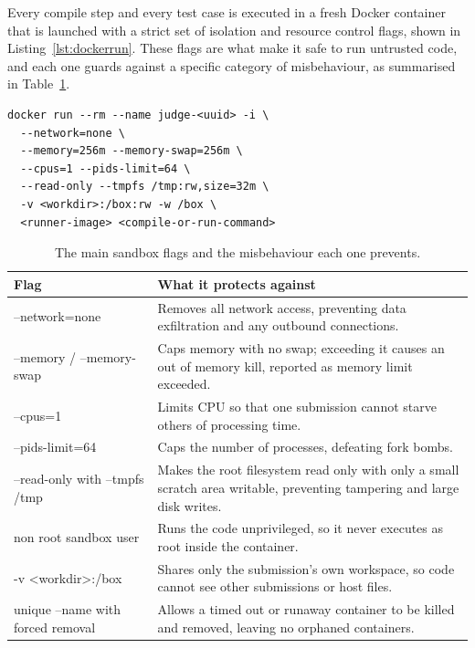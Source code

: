\documentclass[12pt,a4paper]{report}
\begin{document}
Every compile step and every test case is executed in a fresh Docker container that is launched with a strict set of isolation and resource control flags, shown in Listing~\ref{lst:dockerrun}. These flags are what make it safe to run untrusted code, and each one guards against a specific category of misbehaviour, as summarised in Table~\ref{tab:flags}.

\begin{lstlisting}[caption={The argument list used to launch each sandbox container.},label={lst:dockerrun}]
docker run --rm --name judge-<uuid> -i \
  --network=none \
  --memory=256m --memory-swap=256m \
  --cpus=1 --pids-limit=64 \
  --read-only --tmpfs /tmp:rw,size=32m \
  -v <workdir>:/box:rw -w /box \
  <runner-image> <compile-or-run-command>
\end{lstlisting}

\begin{table}[htbp]
  \centering
  \caption{The main sandbox flags and the misbehaviour each one prevents.}
  \label{tab:flags}
  \begin{tabular}{|p{}|p{}|}
    \hline
    \textbf{Flag} & \textbf{What it protects against} \\
    \hline
    {\ttfamily --network=none} & Removes all network access, preventing data exfiltration and any outbound connections. \\
    \hline
    {\ttfamily --memory} / {\ttfamily --memory-swap} & Caps memory with no swap; exceeding it causes an out of memory kill, reported as memory limit exceeded. \\
    \hline
    {\ttfamily --cpus=1} & Limits CPU so that one submission cannot starve others of processing time. \\
    \hline
    {\ttfamily --pids-limit=64} & Caps the number of processes, defeating fork bombs. \\
    \hline
    {\ttfamily --read-only} with {\ttfamily --tmpfs /tmp} & Makes the root filesystem read only with only a small scratch area writable, preventing tampering and large disk writes. \\
    \hline
    non root sandbox user & Runs the code unprivileged, so it never executes as root inside the container. \\
    \hline
    {\ttfamily -v <workdir>:/box} & Shares only the submission's own workspace, so code cannot see other submissions or host files. \\
    \hline
    unique {\ttfamily --name} with forced removal & Allows a timed out or runaway container to be killed and removed, leaving no orphaned containers. \\
    \hline
  \end{tabular}
\end{table}
\end{document}
